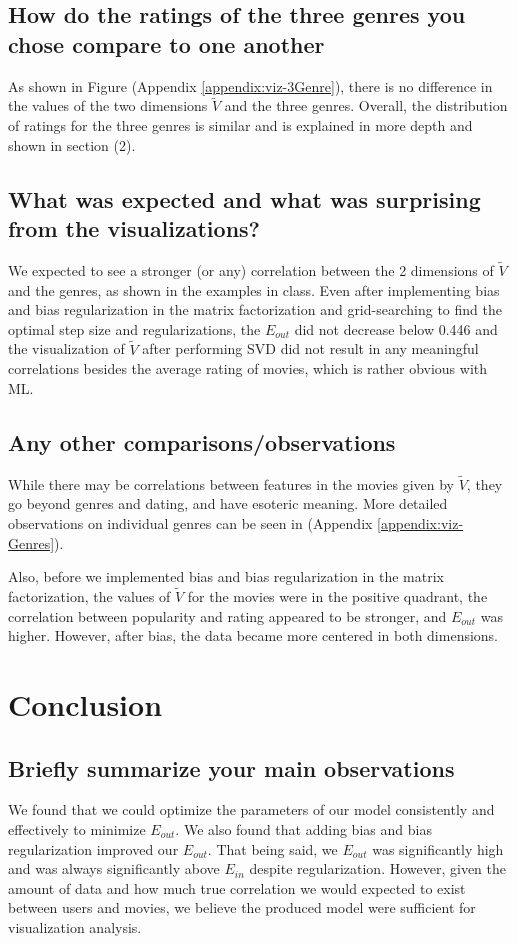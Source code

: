 \subsection*{How do the ratings of the three genres you chose compare to one another}
As shown in Figure (Appendix \ref{appendix:viz-3Genre}), there is no difference in the values of the two dimensions $\widetilde{V}$ and the three genres. Overall, the distribution of ratings for the three genres is similar and is explained in more depth and shown in section (2).

\subsection*{What was expected and what was surprising from the visualizations?}
We expected to see a stronger (or any) correlation between the 2 dimensions of $\widetilde{V}$ and the genres, as shown in the examples in class. Even after implementing bias and bias regularization in the matrix factorization and grid-searching to find the optimal step size and regularizations, the $E_{out}$ did not decrease below 0.446 and the visualization of $\widetilde{V}$ after performing SVD did not result in any meaningful correlations besides the average rating of movies, which is rather obvious with ML.

\subsection*{Any other comparisons/observations}
While there may be correlations between features in the movies given by $\widetilde{V}$, they go beyond genres and dating, and have esoteric meaning. More detailed observations on individual genres can be seen in  (Appendix \ref{appendix:viz-Genres}).

Also, before we implemented bias and bias regularization in the matrix factorization, the values of $\widetilde{V}$ for the movies were in the positive quadrant, the correlation between popularity and rating appeared to be stronger, and $E_{out}$ was higher. However, after bias, the data became more centered in both dimensions.


\section{Conclusion}
\medskip
\subsection*{Briefly summarize your main observations}
We found that we could optimize the parameters of our model consistently and effectively to minimize $E_{out}$.  We also found that adding bias and bias regularization improved our $E_{out}$. That being said, we $E_{out}$ was significantly high and was always significantly above $E_{in}$ despite regularization. However, given the amount of data and how much true correlation we would expected to exist between users and movies, we believe the produced model were sufficient for visualization analysis.
